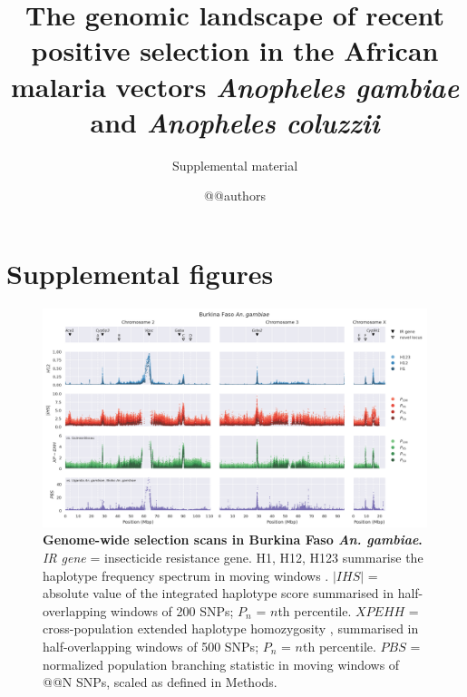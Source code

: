 \documentclass[a4paper,11pt,abstracton,hidelinks]{scrartcl}
\title{
The genomic landscape of recent positive selection in the African malaria vectors \textit{Anopheles gambiae} and \textit{Anopheles coluzzii}
}
\subtitle{\large{Supplemental material}}
\author{@@authors}
\begin{document}
\maketitle

\beginsupplement

\tableofcontents
\listoffigures

\clearpage


\section{Supplemental figures}


\begin{landscape}

\begin{figure}[t!]
	\begin{center}
		\includegraphics*[width=1.05\linewidth,center]{artwork/gwss_bf_gam_gw_ug_gam_gq_gam.png}
	\end{center}
	\caption[Genome-wide selection scans in Burkina Faso \textit{An. gambiae}]{
	\textbf{Genome-wide selection scans in Burkina Faso \textit{An. gambiae}.} 
	\textit{IR gene} = insecticide resistance gene. 
	H1, H12, H123 summarise the haplotype frequency spectrum in moving windows \citep{Garud2015}. 
	$|IHS|$ = absolute value of the integrated haplotype score \citep{Voight2006} summarised in half-overlapping windows of 200 SNPs; $P_{n}$ = $n$th percentile. 
	$XPEHH$ = cross-population extended haplotype homozygosity \citep{Sabeti2007}, summarised in half-overlapping windows of 500 SNPs; $P_{n}$ = $n$th percentile.
	$PBS$ = normalized population branching statistic \citep{Crawford2017} in moving windows of @@N SNPs, scaled as defined in Methods.
	} 
	\label{fig:gwss_bf_gam}
\end{figure}



\end{landscape}
\end{document}

